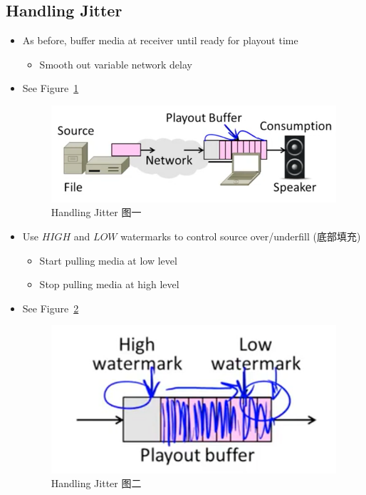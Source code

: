 \documentclass[12pt]{ctexart}   %
\begin{document}
	\subsection{Handling Jitter}
	\begin{itemize}
		\item As before, buffer media at receiver until ready for playout time
		\begin{itemize}
			\item Smooth out variable network delay
		\end{itemize}
		\item See Figure~\ref{fig:9-3-2}
		  
		 \begin{figure}[h!] %
		\centering
		 \includegraphics[scale=0.7]{images/9-3-2}
		\caption{ Handling Jitter 图一}
		 \label{fig:9-3-2}
		 \end{figure}
		 
		 \item Use $HIGH$ and $LOW$ watermarks to control source over/underfill (底部填充)
		 \begin{itemize}
		 	\item Start pulling media at low level
		 	\item Stop pulling media at high level
		 \end{itemize}
		 \item See Figure~\ref{fig:9-3-3}
		  
		 \begin{figure}[h!] %
		\centering
		 \includegraphics[scale=0.7]{images/9-3-3}
		\caption{ Handling Jitter 图二}
		 \label{fig:9-3-3}
		 \end{figure}
	\end{itemize}
	
\end{document}
